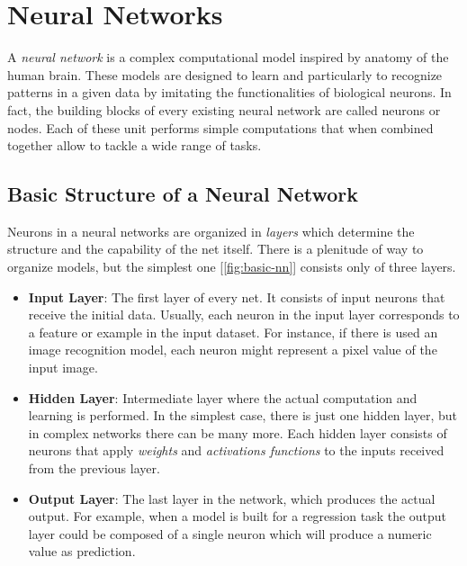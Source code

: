 \documentclass[../Thesis.tex]{subfiles}
\begin{document}
	
	\section{Neural Networks}
	\label{sec:neural_networks}
	
	A \emph{neural network} is a complex computational model inspired by anatomy of the human brain. These models are designed to learn and particularly to recognize patterns in a given data by imitating the functionalities of biological neurons. In fact, the building blocks of every existing neural network are called neurons or nodes. Each of these unit performs simple computations that when combined together allow to tackle a wide range of tasks.
	
	\subsection{Basic Structure of a Neural Network}
	
	Neurons in a neural networks are organized in \emph{layers} which determine the structure and the capability of the net itself. There is a plenitude of way to organize models, but the simplest one [\autoref{fig:basic-nn}] consists only of three layers.
	
	\begin{itemize}
		\item \textbf{Input Layer}: The first layer of every net. It consists of input neurons that receive the initial data. Usually, each neuron in the input layer corresponds to a feature or example in the input dataset. For instance, if there is used an image recognition model, each neuron might represent a pixel value of the input image.
		
		\item \textbf{Hidden Layer}: Intermediate layer where the actual computation and learning is performed. In the simplest case, there is just one hidden layer, but in complex networks there can be many more. Each hidden layer consists of neurons that apply \emph{weights} and \emph{activations functions} to the inputs received from the previous layer.
		
		\item \textbf{Output Layer}: The last layer in the network, which produces the actual output. For example, when a model is built for a regression task the output layer could be composed of a single neuron which will produce a numeric value as prediction.
	\end{itemize}
	
\end{document}
